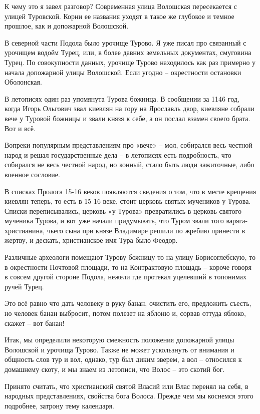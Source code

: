    К чему это я завел разговор? Современная улица Волошская пересекается с улицей Туровской. Корни ее названия уходят в такое же глубокое и темное прошлое, как и допожарной Волошской.

   В северной части Подола было урочище Турово. Я уже писал про связанный с урочищем водоём Турец, или, в более давних земельных документах, смуговина Турец. По совокупности данных, урочище Турово находилось как раз примерно у начала допожарной улицы Волошской. Если угодно – окрестности остановки Оболонская.

   В летописях один раз упомянута Турова божница. В сообщении за 1146 год, когда Игорь Ольгович звал киевлян на гору на Ярославль двор, киевляне собрали вече у Туровой  божницы и звали князя к себе, а он послал взамен своего брата. Вот и всё.

Вопреки популярным представлениям про «вече» – мол, собирался весь честной народ и решал государственные дела – в летописях есть подробность, что собирался не весь честной народ, но конный, стало быть люди зажиточные, либо военное сословие.

   В списках Пролога 15-16 веков появляются сведения о том, что в месте крещения киевлян теперь, то есть в 15-16 веке, стоит церковь святых мучеников у Турова. Списки переписывались, церковь «у Турова» превратились в церковь святого мученика Турова, и вот уже начали придумывать, что Туром звали того варяга-христианина, чьего сына при князе Владимире решили по жребию принести в жертву, и дескать, христианское имя Тура было Феодор.

   Различные археологи помещают Турову божницу то на улицу Борисоглебскую, то в окрестности Почтовой площади, то на Контрактовую площадь – короче говоря в совсем другой стороне Подола, нежели где протекал уцелевший в топонимах ручей Турец.

   Это всё равно что дать человеку в руку банан, очистить его, предложить съесть, но человек банан выбросит, потом полезет на яблоню и, сорвав оттуда яблоко, скажет – вот банан!

   Итак, мы определили некоторую смежность положения допожарной улицы Волошской и урочища Турово. Также не может ускользнуть от внимания и общность слов тур и вол, однако, тур был диким зверем, а вол – относился к домашнему скоту, и мы знаем из летописи, что Волос – это скотий бог.

   Принято считать, что христианский святой Власий или Влас перенял на себя, в народных представлениях, свойства бога Волоса. Прежде чем мы коснемся этого подробнее, затрону тему календаря.

